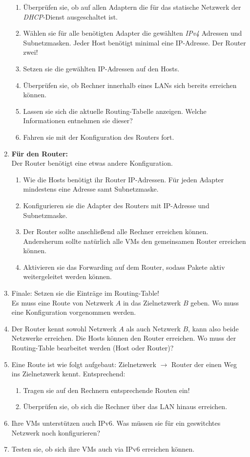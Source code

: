 \documentclass[paper=a4,fontsize=11pt]{scrartcl}%
\numberwithin{equation}{section}
\begin{document}
\begin{enumerate}
\begin{enumerate}
		\item Überprüfen sie, ob auf allen Adaptern die für das statische Netzwerk der \emph{DHCP}-Dienst ausgeschaltet ist.
		\item Wählen sie für alle benötigten Adapter die gewählten \emph{IPv4} Adressen und Subnetzmasken. Jeder Host benötigt minimal eine IP-Adresse. Der Router zwei!
		\item Setzen sie die gewählten IP-Adressen auf den Hosts.
		\item Überprüfen sie, ob Rechner innerhalb eines LANs sich bereits erreichen können.
		\item Lassen sie sich die aktuelle Routing-Tabelle anzeigen. Welche Informationen entnehmen sie dieser?
		\item Fahren sie mit der Konfiguration des Routers fort.
	\end{enumerate}
	\item \textbf{Für den Router:}\\
	Der Router benötigt eine etwas andere Konfiguration. 
	\begin{enumerate}
		\item Wie die Hosts benötigt ihr Router IP-Adressen. Für jeden Adapter mindestens eine Adresse samt Subnetzmaske. 
		\item Konfigurieren sie die Adapter des Routers mit IP-Adresse und Subnetzmaske.
		\item Der Router sollte anschließend alle Rechner erreichen können. Andersherum sollte natürlich alle VMs den gemeinsamen Router erreichen können.
		\item Aktivieren sie das Forwarding auf dem Router, sodass Pakete aktiv weitergeleitet werden können.
		\end{enumerate}
		\item Finale: Setzen sie die Einträge im Routing-Table!\\
		Es muss eine Route von Netzwerk $A$ in das Zielnetzwerk $B$ geben. Wo muss eine Konfiguration vorgenommen werden.
		\item Der Router kennt sowohl Netzwerk $A$ als auch Netzwerk $B$, kann also beide Netzwerke erreichen. Die Hosts können den Router erreichen. Wo muss der Routing-Table bearbeitet werden (Host oder Router)?
		\item Eine Route ist wie folgt aufgebaut: Zielnetzwerk $\to$ Router der einen Weg ins Zielnetzwerk kennt. Entsprechend:
		\begin{enumerate}
			\item Tragen sie auf den Rechnern entsprechende Routen ein!
			\item Überprüfen sie, ob sich die Rechner über das LAN hinaus erreichen.
		\end{enumerate}
	\item Ihre VMs unterstützen auch IPv6. Was müssen sie für ein geswitchtes Netzwerk noch konfigurieren?
	\item Testen sie, ob sich ihre VMs auch via IPv6 erreichen können.
\end{enumerate}






\printbibliography
\end{document}
